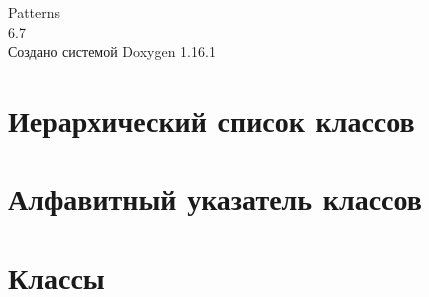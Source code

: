 \documentclass[twoside]{book}
\newcommand{\+}{\discretionary{\mbox{\scriptsize$\hookleftarrow$}}{}{}}
\newcommand{\clearemptydoublepage}{%
    \newpage{\pagestyle{empty}\cleardoublepage}%
  }
\begin{document}
  \raggedbottom
    \hypersetup{pageanchor=false,
                bookmarksnumbered=true,
                pdfencoding=unicode
               }
  \begin{titlepage}
  \vspace*{7cm}
  \begin{center}%
  {\Large Patterns}\\
  [1ex]\large 6.\+7 \\
  \vspace*{1cm}
  {\large Создано системой Doxygen 1.16.1}\\
  \end{center}
  \end{titlepage}
  \clearemptydoublepage
  \tableofcontents
  \clearemptydoublepage
  \hypersetup{pageanchor=true}

\chapter{Иерархический список классов}

\chapter{Алфавитный указатель классов}

\chapter{Классы}

























  \backmatter
  \newpage
  \clearemptydoublepage
  \printindex
\end{document}
